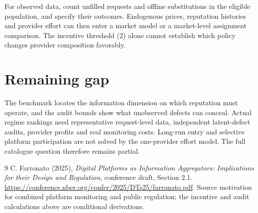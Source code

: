 \documentclass[11pt,a4paper]{article}
\begin{document}
For observed data, count unfilled requests and offline substitutions in the eligible population, and specify their outcomes. Endogenous prices, reputation histories and provider effort can then enter a market model or a market-level assignment comparison. The incentive threshold (2) alone cannot establish which policy changes provider composition favorably.

\section{Remaining gap}
The benchmark locates the information dimension on which reputation must operate, and the audit bounds show what unobserved defects can conceal. Actual regime rankings need representative request-level data, independent latent-defect audits, provider profits and real monitoring costs. Long-run entry and selective platform participation are not solved by the one-provider effort model. The full catalogue question therefore remains partial.
\begin{thebibliography}{9}
 C. Farronato (2025), \emph{Digital Platforms as Information Aggregators: Implications for their Design and Regulation}, conference draft, Section 2.1. \url{https://conference.nber.org/confer/2025/DTs25/farronato.pdf}. Source motivation for combined platform monitoring and public regulation; the incentive and audit calculations above are conditional derivations.
\end{thebibliography}
\end{document}
